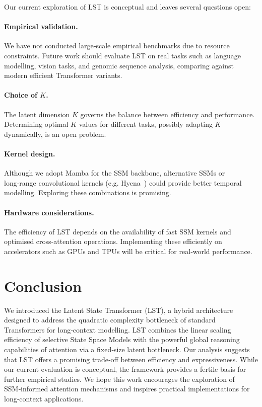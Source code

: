 \documentclass[10pt,twocolumn,letterpaper]{article}
\begin{document}
Our current exploration of LST is conceptual and leaves several questions open:

\paragraph{Empirical validation.}  We have not conducted large‑scale empirical benchmarks due to resource constraints.  Future work should evaluate LST on real tasks such as language modelling, vision tasks, and genomic sequence analysis, comparing against modern efficient Transformer variants.

\paragraph{Choice of $K$.}  The latent dimension $K$ governs the balance between efficiency and performance.  Determining optimal $K$ values for different tasks, possibly adapting $K$ dynamically, is an open problem.

\paragraph{Kernel design.}  Although we adopt Mamba for the SSM backbone, alternative SSMs or long‑range convolutional kernels (e.g. Hyena \cite{poli2023hyena}) could provide better temporal modelling.  Exploring these combinations is promising.

\paragraph{Hardware considerations.}  The efficiency of LST depends on the availability of fast SSM kernels and optimised cross‑attention operations.  Implementing these efficiently on accelerators such as GPUs and TPUs will be critical for real‑world performance.

\section{Conclusion}

We introduced the Latent State Transformer (LST), a hybrid architecture designed to address the quadratic complexity bottleneck of standard Transformers for long‑context modelling.  LST combines the linear scaling efficiency of selective State Space Models with the powerful global reasoning capabilities of attention via a fixed‑size latent bottleneck.  Our analysis suggests that LST offers a promising trade‑off between efficiency and expressiveness.  While our current evaluation is conceptual, the framework provides a fertile basis for further empirical studies.  We hope this work encourages the exploration of SSM‑informed attention mechanisms and inspires practical implementations for long‑context applications.



\end{document}
